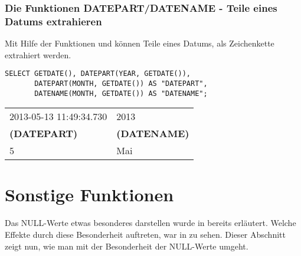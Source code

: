         \subsubsection{Die Funktionen DATEPART/DATENAME - Teile eines Datums extrahieren}
          Mit Hilfe der Funktionen  und  können Teile eines Datums, als Zeichenkette extrahiert werden.
          \begin{lstlisting}[language=ms_sql,caption={\languagemssql{DATEPART} und \languagemssql{DATENAME} in SQL Server},label=sql03_24]
SELECT GETDATE(), DATEPART(YEAR, GETDATE()),
       DATEPART(MONTH, GETDATE()) AS "DATEPART",
       DATENAME(MONTH, GETDATE()) AS "DATENAME";
          \end{lstlisting}
          \begin{center}
            \begin{small}
              \tabletail{}
              \tablelasttail{}
              \begin{mssql}
                \begin{supertabular}{ll}
                  2013-05-13 11:49:34.730 & 2013 \\
                  \textbf{(DATEPART)} & \textbf{(DATENAME)} \\
                  \cmidrule(l){1-1}\cmidrule(l){2-2}
                  5 & Mai \\
                \end{supertabular}
              \end{mssql}
            \end{small}
          \end{center}
    \section{Sonstige Funktionen}
      Das NULL-Werte etwas besonderes darstellen wurde in 
      bereits erläutert. Welche Effekte durch diese Besonderheit auftreten,
      war in  zu sehen. Dieser Abschnitt zeigt nun, wie man
      mit der Besonderheit der NULL-Werte umgeht.

